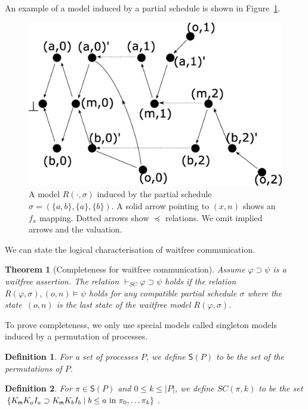 \documentclass[doctor]{iscs-thesis}
\newcommand{\memory}{{\sf m}}
\newtheorem{definition}{Definition}
\newtheorem{theorem}{Theorem}
\begin{document}
An example of a model induced by a partial schedule is shown in
Figure~\ref{schedulemodel}.
\begin{figure}
\begin{center}
 \includegraphics[scale=0.3]{schedulemodel.eps} 
\end{center}
\caption[A model $R(\cdot, \sigma)$.]{A model $R(\cdot, \sigma)$
 induced by the partial schedule $\sigma = \left(\{a,b\}, \{a\}, \{b\}\right)$.
 A solid arrow pointing to $(x,n)$ shows an $f_x$ mapping.  Dotted arrows show $\preceq$ relations.
 We omit implied arrows and the valuation.}
 \label{schedulemodel}
\end{figure}

We can state the logical characterisation of waitfree communication.
\begin{theorem}[Completeness for waitfree communication]
\label{wf:sc-comp}
 Assume $\varphi\supset \psi$ is a waitfree assertion.
 The relation $\vdash_{SC} \varphi\supset\psi$ holds if the relation $R(\varphi, \sigma),
 (o,n) \models \psi$ holds for any compatible partial schedule $\sigma$ where the state~$(o,n)$
 is the last state of the waitfree model $R(\varphi, \sigma)$.
\end{theorem}
To prove completeness, we only use special models called singleton
models induced by a permutation of processes.

\begin{definition}
 For a set of processes $P$, we define $\mathsf S(P)$ to be the set of the permutations of $P$.
\end{definition}

\begin{definition}
 For $\pi\in \mathsf S(P)$ and $0\le k\le |P|$, we define
 $SC(\pi,k)$ to be the set $\{K_\memory K_a I_a\supset K_\memory K_b I_b\mid b\le a\mbox{ in }\pi_0,\ldots \pi_k\}$.
\end{definition}
\end{document}
